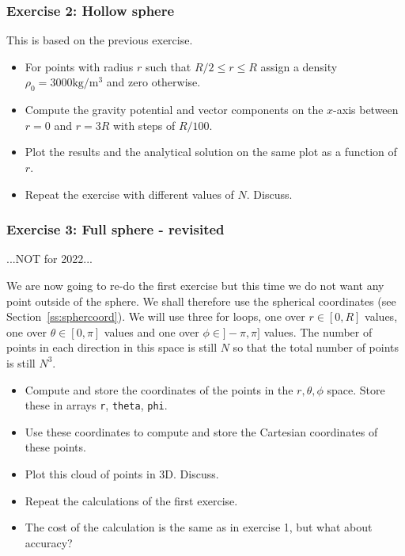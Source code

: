 \subsubsection*{Exercise 2: Hollow sphere}

This is based on the previous exercise. 
\begin{itemize}
\item For points with radius $r$ such that $R/2 \le r \le R$ assign a density $\rho_0=3000\si{\kilo\gram\per\cubic\metre}$ 
and zero otherwise.
\item Compute the gravity potential and vector components on the $x$-axis between $r=0$ and $r=3R$ 
with steps of $R/100$.
\item Plot the results and the analytical solution on the same plot as a function of $r$.
\item Repeat the exercise with different values of $N$. Discuss.
\end{itemize}




\subsubsection*{Exercise 3: Full sphere - revisited}

...NOT for 2022...

We are now going to re-do the first exercise but this time we do not want any point outside of the sphere. 
We shall therefore use the spherical coordinates (see Section~\ref{ss:sphercoord}).
We will use three for loops, one over $r\in[0,R]$ values, 
one over $\theta\in[0,\pi]$ values and one over $\phi\in]-\pi,\pi]$ values. The number 
of points in each direction in this space is still $N$ so that the total number of points is
still $N^3$.

\begin{itemize}
\item Compute and store the coordinates of the points in the $r,\theta,\phi$ space. Store 
these in arrays {\tt r}, {\tt theta}, {\tt phi}.
\item Use these coordinates to compute and store the Cartesian coordinates of these points. 
\item Plot this cloud of points in 3D. Discuss.
\item Repeat the calculations of the first exercise.
\item The cost of the calculation is the same as in exercise 1, but what about accuracy?
\end{itemize}


